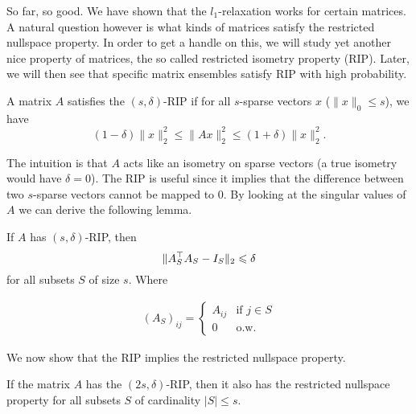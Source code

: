So far, so good. We have shown that the $l_1$-relaxation works for certain matrices. A natural question however is what kinds of matrices satisfy the restricted nullspace property. In order to get a handle on this, we will study yet another nice property of matrices, the so called restricted isometry property (RIP). Later, we will then see that specific matrix ensembles satisfy RIP with high probability.
\begin{definition}
A matrix $A$ satisfies the $(s, \delta)$-RIP if for all $s$-sparse vectors $x$ ($\|x\|_0 \le s$), we have
\[
(1 - \delta)\|x\|_2^2 \le \|Ax\|_2^2 \le (1 + \delta) \|x\|_2^2.
\]
\end{definition}
The intuition is that $A$ acts like an isometry on sparse vectors (a true isometry would have $\delta = 0$). The RIP is useful since it implies that the difference between two $s$-sparse vectors cannot be mapped to $0$. By looking at the singular values of $A$ we can derive the following lemma.
\begin{lemma}
\label{RIPlemma}
If $A$ has $(s, \delta)$-RIP, then
\[
\|A_S^{\top}A_S - I_S\|_2 \leqslant \delta
\]
for all subsets $S$ of size $s$. Where

\begin{align*}
    (A_S)_{ij} = \begin{cases}
    A_{ij} & \text{if } j \in S \\
    0 & \text{o.w}.
    \end{cases}
\end{align*}
\end{lemma}
We now show that the RIP implies the restricted nullspace property. 
\begin{theorem}
If the matrix $A$ has the $(2s, \delta)$-RIP, then it also has the restricted nullspace property for all subsets $S$ of cardinality $|S| \le s$.
\end{theorem}
